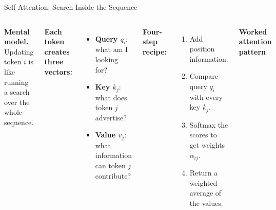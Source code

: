 \documentclass[aspectratio=169,11pt]{beamer}
\begin{document}
\begin{frame}{Self-Attention: Search Inside the Sequence}
\begin{columns}[T]
{\footnotesize\textbf{Mental model.} Updating token $i$ is like running a search over the whole sequence.}

\vspace{0.08cm}
{\small\textbf{Each token creates three vectors:}}
\begin{itemize}\itemsep0pt
    \item[\textcolor{softblue}{$\blacktriangleright$}] {\footnotesize \textcolor{softblue}{\textbf{Query $q_i$}}: what am I looking for?}
    \item[\textcolor{harvardcrimson}{$\blacktriangleright$}] {\footnotesize \textcolor{harvardcrimson}{\textbf{Key $k_j$}}: what does token $j$ advertise?}
    \item[\textcolor{softgreen}{$\blacktriangleright$}] {\footnotesize \textcolor{softgreen}{\textbf{Value $v_j$}}: what information can token $j$ contribute?}
\end{itemize}

\vspace{0.08cm}
{\small\textbf{Four-step recipe:}}
\begin{enumerate}\itemsep0pt
    \item Add position information.
    \item Compare query $q_i$ with every key $k_j$.
    \item Softmax the scores to get weights $\alpha_{ij}$.
    \item Return a weighted average of the values.
\end{enumerate}

\centering
{\small\textbf{Worked attention pattern}}


\end{columns}
\end{frame}
\end{document}
